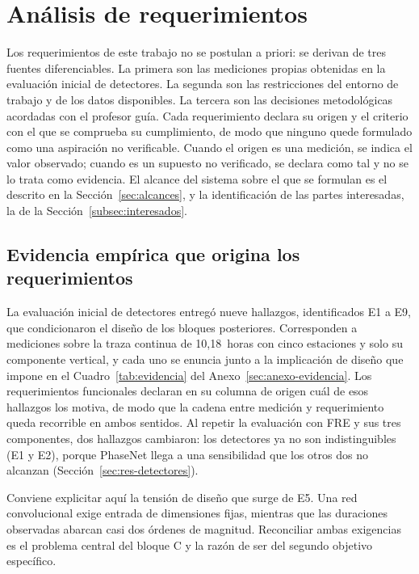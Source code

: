 \section{Análisis de requerimientos}
\label{sec:requerimientos}

Los requerimientos de este trabajo no se postulan a priori: se derivan de tres
fuentes diferenciables. La primera son las mediciones propias obtenidas en la
evaluación inicial de detectores. La segunda son las restricciones del entorno
de trabajo y de los datos disponibles. La tercera son las decisiones
metodológicas acordadas con el profesor guía. Cada requerimiento declara su
origen y el criterio con el que se comprueba su cumplimiento, de modo que
ninguno quede formulado como una aspiración no verificable. Cuando el origen es
una medición, se indica el valor observado; cuando es un supuesto no
verificado, se declara como tal y no se lo trata como evidencia. El alcance del
sistema sobre el que se formulan es el descrito en la
Sección~\ref{sec:alcances}, y la identificación de las partes interesadas, la de
la Sección~\ref{subsec:interesados}.

\subsection{Evidencia empírica que origina los requerimientos}
\label{sec:evidencia}

La evaluación inicial de detectores entregó nueve hallazgos, identificados E1 a
E9, que condicionaron el diseño de los bloques posteriores. Corresponden a
mediciones sobre la traza continua de 10,18~horas con cinco estaciones y solo
su componente vertical, y cada uno se enuncia junto a la implicación de diseño
que impone en el Cuadro~\ref{tab:evidencia} del Anexo~\ref{sec:anexo-evidencia}.
Los requerimientos funcionales declaran en su columna de origen cuál de esos
hallazgos los motiva, de modo que la cadena entre medición y requerimiento queda
recorrible en ambos sentidos. Al repetir la evaluación con FRE y sus tres
componentes, dos hallazgos cambiaron: los detectores ya no son
indistinguibles (E1 y E2), porque PhaseNet llega a una sensibilidad que los
otros dos no alcanzan (Sección~\ref{sec:res-detectores}).

Conviene explicitar aquí la tensión de diseño que surge de E5. Una red
convolucional exige entrada de dimensiones fijas, mientras que las duraciones
observadas abarcan casi dos órdenes de magnitud. Reconciliar ambas exigencias es
el problema central del bloque C y la razón de ser del segundo objetivo
específico.

